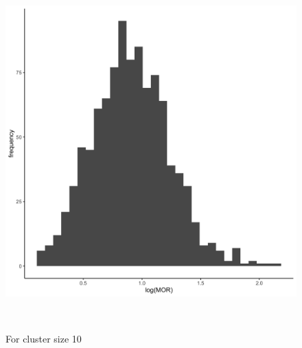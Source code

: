 \documentclass[
  letterpaper,
  DIV=11,
  numbers=noendperiod,
  titlepage]{scrartcl}
\begin{document}
\begin{figure}
\begin{minipage}[t]{0.50\linewidth}
{{\includegraphics{../../plots/two-lvl-ran-slope/low-prev/hist_30_10_two_lvl_slp_low_prev.png}

}

\caption{For cluster size 10}

}

\end{minipage}%
\newline
\begin{minipage}[t]{\linewidth}

{\centering 

~

}

\end{minipage}%
\newline
\begin{minipage}[t]{0.50\linewidth}

{\centering 

\raisebox{-\height}{

}}
\end{minipage}
\end{figure}
\end{document}
